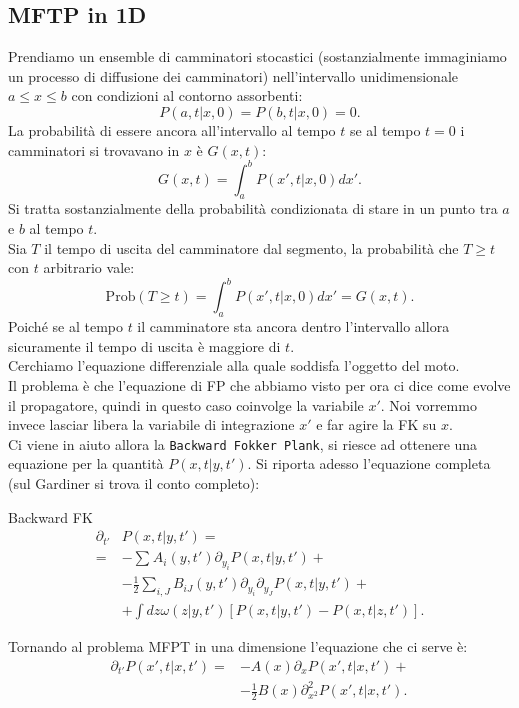 \subsection{MFTP in 1D}%
\label{sub:MFTP in 1D}
Prendiamo un ensemble di camminatori stocastici (sostanzialmente immaginiamo un processo di diffusione dei camminatori) nell'intervallo unidimensionale $a\le x \le b$ con condizioni al contorno assorbenti:
\[
    P\left(a,t|x,0\right) = P\left(b,t|x,0\right)=0 
.\] 
La probabilità di essere ancora all'intervallo al tempo $t$ se al tempo $t=0$ i camminatori si trovavano in $x$ è $G(x,t)$:
\[
    G(x,t) = \int_{a}^{b} P(x',t|x, 0) dx' 
.\] 
Si tratta sostanzialmente della probabilità condizionata di stare in un punto tra $a$ e $b$ al tempo $t$.\\
Sia $T$ il tempo di uscita del camminatore dal segmento, la probabilità che $T\ge t$ con $t$ arbitrario vale:
\[
    \text{Prob}(T\ge t) = \int_{a}^{b} P\left(x',t|x,0\right)dx' = G(x,t)  
.\] 
Poiché se al tempo $t$  il camminatore sta ancora dentro l'intervallo allora sicuramente il tempo di uscita è maggiore di $t$.\\
Cerchiamo l'equazione differenziale alla quale soddisfa l'oggetto del moto. \\
Il problema è che l'equazione di FP che abbiamo visto per ora ci dice come evolve il propagatore, quindi in questo caso coinvolge la variabile $x'$. 
Noi vorremmo invece lasciar libera la variabile di integrazione $x'$ e far agire la FK su $x$. \\
Ci viene in aiuto allora la \texttt{Backward Fokker Plank}, si riesce ad ottenere una equazione per la quantità $P\left(x,t|y,t'\right)$. Si riporta adesso l'equazione completa (sul Gardiner si trova il conto completo):
\begin{redbox}{Backward FK}
\[\begin{aligned}
     \partial_{t'}&P\left(x,t|y,t'\right) = \\
    = & - \sum_{}^{} A_i(y,t') \partial_{y_i}P\left(x,t|y,t'\right) +\\
      & - \frac{1}{2}\sum_{i,J}^{} B_{iJ}(y,t') \partial_{y_i}\partial_{y_J}P\left(x,t|y,t'\right) + \\
      & + \int dz \omega\left(z|y,t'\right)\left[P\left(x,t|y,t'\right)-P\left(x,t|z,t'\right)\right]
.\end{aligned}\]    
\end{redbox}
\noindent
Tornando al problema MFPT in una dimensione l'equazione che ci serve è:
\[\begin{aligned}
    \partial_{t'}P\left(x',t|x,t'\right) = & -A(x) \partial_{x}P\left(x',t|x,t'\right) +\\
					   &-\frac{1}{2}B(x) \partial^2_{x^2}P\left(x',t|x,t'\right)
.\end{aligned}\]
